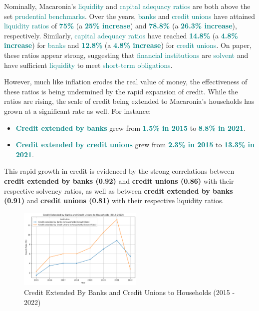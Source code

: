 Nominally, Macaronia's \textcolor{teal}{liquidity} and \textcolor{teal}{capital adequacy ratios} are both above the set \textcolor{teal}{prudential benchmarks}.  
Over the years, \textcolor{teal}{banks} and \textcolor{teal}{credit unions} have attained \textcolor{teal}{liquidity ratios} of \textbf{\textcolor{teal}{75\%}} (a \textbf{\textcolor{teal}{25\% increase}})  
and \textbf{\textcolor{teal}{78.8\%}} (a \textbf{\textcolor{teal}{26.3\% increase}}), respectively.  
Similarly, \textcolor{teal}{capital adequacy ratios} have reached \textbf{\textcolor{teal}{14.8\%}} (a \textbf{\textcolor{teal}{4.8\% increase}}) for \textcolor{teal}{banks}  
and \textbf{\textcolor{teal}{12.8\%}} (a \textbf{\textcolor{teal}{4.8\% increase}}) for \textcolor{teal}{credit unions}.  
On paper, these ratios appear strong, suggesting that \textcolor{teal}{financial institutions} are \textcolor{teal}{solvent}  
and have sufficient \textcolor{teal}{liquidity} to meet \textcolor{teal}{short-term obligations}.


However, much like inflation erodes the real value of money, the effectiveness of these ratios is being 
undermined by the rapid expansion of credit. While the ratios are rising, the scale of credit being extended 
to Macaronia's households has grown at a significant rate as well. For instance:

\begin{itemize}
    \item \textbf{\textcolor{teal}{Credit extended by banks}} grew from \textbf{\textcolor{teal}{1.5\% in 2015}} to \textbf{\textcolor{teal}{8.8\% in 2021}}.
    \item \textbf{\textcolor{teal}{Credit extended by credit unions}} grew from \textbf{\textcolor{teal}{2.3\% in 2015}} to \textbf{\textcolor{teal}{13.3\% in 2021}}.
\end{itemize}

This rapid growth in credit is evidenced by the strong correlations between 
\textbf{credit extended by banks (0.92)} and \textbf{credit unions (0.86)} with their respective 
solvency ratios, as well as between \textbf{credit extended by banks (0.91)} and \textbf{credit unions (0.81)} 
with their respective liquidity ratios.

\begin{figure}[h]     
     \centering
     \includegraphics[width=0.53\textwidth]{graph_1.png}
     \caption{Credit Extended By Banks and Credit Unions to Households (2015 - 2022)}
     \label{fig:graph_1}
\end{figure}

